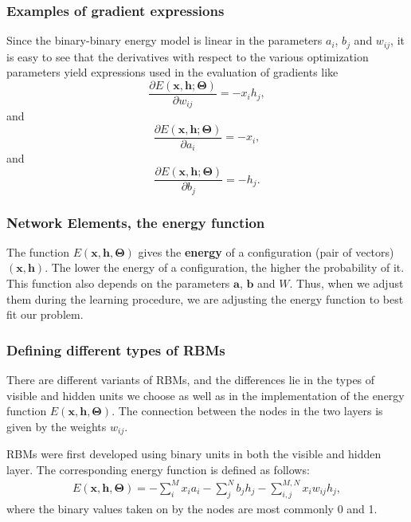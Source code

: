 \documentclass[11pt]{beamer} %
\begin{document}
\begin{frame}
\frametitle{Examples of gradient expressions}

Since the binary-binary energy model is linear in the parameters $a_i$, $b_j$ and
$w_{ij}$, it is easy to see that the derivatives with respect to the
various optimization parameters yield expressions used in the
evaluation of gradients like
\[
\frac{\partial E(\mathbf{x}, \mathbf{h};\mathbf{\Theta})}{\partial w_{ij}}=-x_ih_j,
\]
and
\[
\frac{\partial E(\mathbf{x}, \mathbf{h};\mathbf{\Theta})}{\partial a_i}=-x_i,
\]
and
\[
\frac{\partial E(\mathbf{x}, \mathbf{h};\mathbf{\Theta})}{\partial b_j}=-h_j.
\]
\end{frame}

\begin{frame}
\frametitle{Network Elements, the energy function}

The function $E(\mathbf{x},\mathbf{h},\mathbf{\Theta})$ gives the \textbf{energy} of a
configuration (pair of vectors) $(\mathbf{x}, \mathbf{h})$. The lower
the energy of a configuration, the higher the probability of it. This
function also depends on the parameters $\mathbf{a}$, $\mathbf{b}$ and
$W$. Thus, when we adjust them during the learning procedure, we are
adjusting the energy function to best fit our problem.
\end{frame}

\begin{frame}
\frametitle{Defining different types of RBMs}

There are different variants of RBMs, and the differences lie in the types of visible and hidden units we choose as well as in the implementation of the energy function $E(\mathbf{x},\mathbf{h},\mathbf{\Theta})$. The connection between the nodes in the two layers is given by the weights $w_{ij}$. 


RBMs were first developed using binary units in both the visible and hidden layer. The corresponding energy function is defined as follows:
\begin{align*}
	E(\mathbf{x}, \mathbf{h},\mathbf{\Theta}) = - \sum_i^M x_i a_i- \sum_j^N b_j h_j - \sum_{i,j}^{M,N} x_i w_{ij} h_j,
\end{align*}
where the binary values taken on by the nodes are most commonly 0 and 1.
\end{frame}
\end{document}
